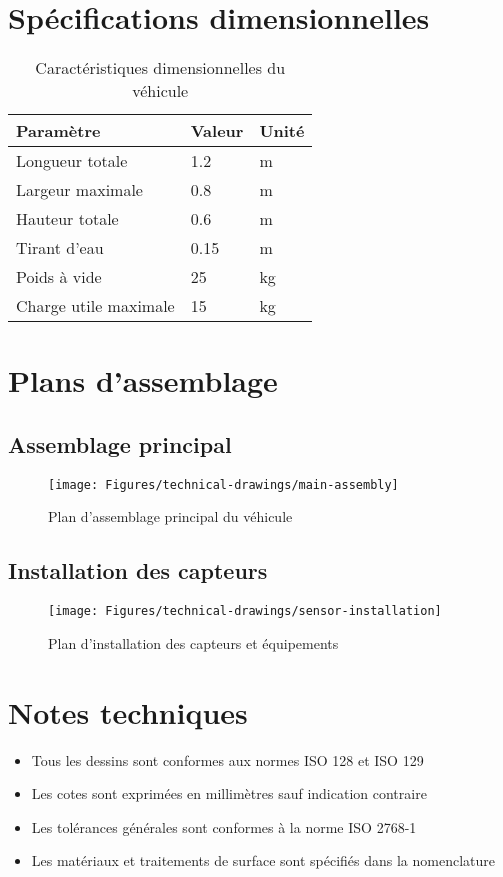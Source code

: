 \section{Spécifications dimensionnelles}
\begin{table}[!htbp]
    \centering
    \caption{Caractéristiques dimensionnelles du véhicule}
    \label{tab:dimensions}
    \begin{tabular}{lll}
        \toprule
        \textbf{Paramètre} & \textbf{Valeur} & \textbf{Unité} \\
        \midrule
        Longueur totale & 1.2 & m \\
        Largeur maximale & 0.8 & m \\
        Hauteur totale & 0.6 & m \\
        Tirant d'eau & 0.15 & m \\
        Poids à vide & 25 & kg \\
        Charge utile maximale & 15 & kg \\
        \bottomrule
    \end{tabular}
\end{table}

\section{Plans d'assemblage}
\subsection{Assemblage principal}
\begin{figure}[!htbp]
    \centering
    \texttt{[image: Figures/technical-drawings/main-assembly]}
    \caption{Plan d'assemblage principal du véhicule}
    \label{fig:main-assembly}
\end{figure}

\subsection{Installation des capteurs}
\begin{figure}[!htbp]
    \centering
    \texttt{[image: Figures/technical-drawings/sensor-installation]}
    \caption{Plan d'installation des capteurs et équipements}
    \label{fig:sensor-installation}
\end{figure}

\section{Notes techniques}
\begin{itemize}
    \item Tous les dessins sont conformes aux normes ISO 128 et ISO 129
    \item Les cotes sont exprimées en millimètres sauf indication contraire
    \item Les tolérances générales sont conformes à la norme ISO 2768-1
    \item Les matériaux et traitements de surface sont spécifiés dans la nomenclature
\end{itemize}

